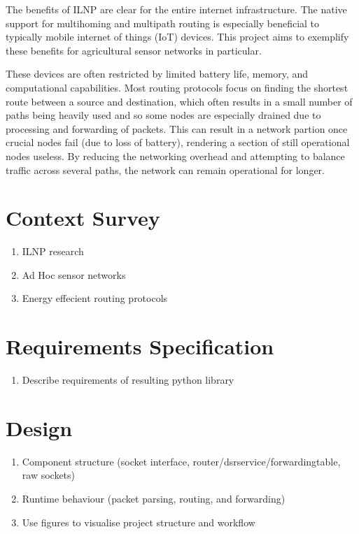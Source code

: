 \documentclass[12pt]{article}
\begin{document}
The benefits of ILNP are clear for the entire internet infrastructure. The native support for multihoming and multipath routing is especially beneficial to typically mobile internet of things (IoT) devices. This project aims to exemplify these benefits for agricultural sensor networks in particular. 

These devices are often restricted by limited battery life, memory, and computational capabilities. Most routing protocols focus on finding the shortest route between a source and destination, which often results in a small number of paths being heavily used and so some nodes are especially drained due to processing and forwarding of packets. This can result in a network partion once crucial nodes fail (due to loss of battery), rendering a section of still operational nodes useless. By reducing the networking overhead and attempting to balance traffic across several paths, the network can remain operational for longer.

\section{Context Survey}


\begin{enumerate}
\item ILNP research 
\item Ad Hoc sensor networks
\item Energy effecient routing protocols
\end{enumerate}

\section{Requirements Specification}

\begin{enumerate}
\item Describe requirements of resulting python library
\end{enumerate}

\section{Design}

\begin{enumerate}
\item Component structure (socket interface, router/dsrservice/forwardingtable, raw sockets)
\item Runtime behaviour (packet parsing, routing, and forwarding)
\item Use figures to visualise project structure and workflow
\end{enumerate}
\end{document}
